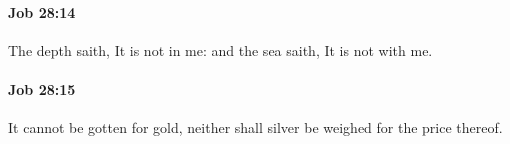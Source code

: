 		\paragraph{Job 28:14} %
			\label{JOB-28-14}

			The depth saith, It is not in me: and the sea saith, It is not with me.


		\paragraph{Job 28:15} %
			\label{JOB-28-15}

			It cannot be gotten for gold, neither shall silver be weighed for the price thereof.


